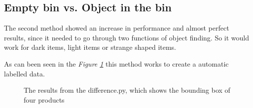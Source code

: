 \subsection{Empty bin vs. Object in the bin}
The second method showed an increase in performance and almost perfect results, since it needed to go through two functions of object finding. So it would work for dark items, light items or strange shaped items.

As can been seen in the \textit{Figure \ref{figure: labelling}} this method works to create a automatic labelled data.

\begin{figure}[h]
    \centering
    \hfill
    \hfill
    \hfill
    \caption{The results from the difference.py, which shows the bounding box of four products}
    \label{figure: labelling}
\end{figure}


